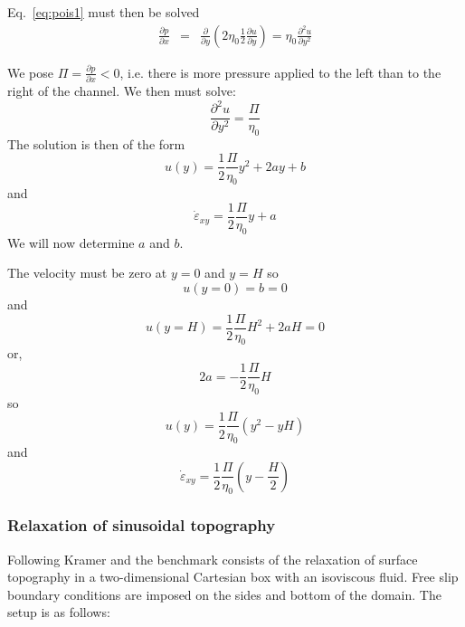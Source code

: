 Eq.~\eqref{eq:pois1} must then be solved 
\begin{eqnarray}
\frac{\partial p}{\partial x}  
&=&\frac{\partial }{\partial y} \left(2\eta_{0}  \frac{1}{2}\frac{\partial u}{\partial y} \right) 
= \eta_0 \frac{\partial^2 u}{\partial y^2}  
\end{eqnarray}

We pose $\Pi=\frac{\partial p}{\partial x}<0$, i.e. 
there is more pressure applied to the left than to the right of the channel.
We then must solve:
\[
\frac{\partial^2 u}{\partial y^2} = \frac{\Pi}{\eta_0} 
\]
The solution is then of the form
\[
u(y) = \frac{1}{2}\frac{\Pi}{\eta_0} y^2 + 2a y + b
\]
and 
\[
\dot{\varepsilon}_{xy}= \frac{1}{2} \frac{\Pi}{\eta_0}y  + a
\]
We will now determine $a$ and $b$.

The velocity must be zero at $y=0$ and $y=H$ so 
\[
u(y=0)=b=0
\] 
and 
\[
u(y=H)=\frac{1}{2}\frac{\Pi}{\eta_0} H^2 + 2a H =0
\]
or, 
\[
2a=-\frac{1}{2}\frac{\Pi}{\eta_0} H
\]
so 
\begin{equation}
\boxed{
u(y) = \frac{1}{2}\frac{\Pi}{\eta_0} (y^2 - y H)
}
\end{equation}
and 
\begin{equation}
\boxed{
\dot{\varepsilon}_{xy}= \frac{1}{2} \frac{\Pi}{\eta_0} \left(y  - \frac{H}{2} \right)
}
\end{equation}
 


 











\subsubsection{Relaxation of sinusoidal topography}

Following Kramer \etal \cite[Section 3.1.1]{krwd12} and \cite{robh17} 
the benchmark consists of the relaxation of surface topography in a 
two-dimensional Cartesian box with an isoviscous fluid. 
Free slip boundary conditions are imposed on the sides and bottom of the domain.
The setup is as follows:

